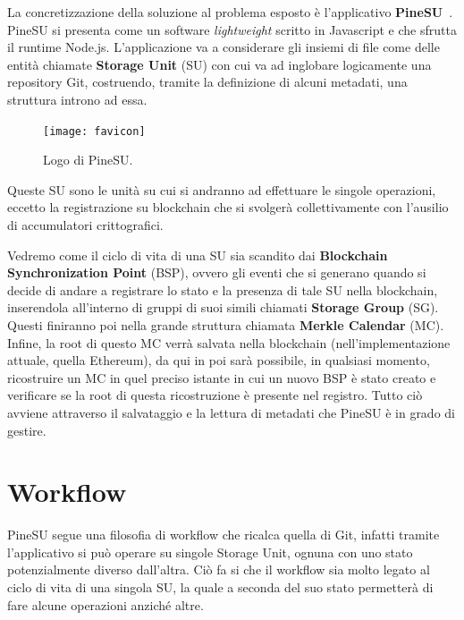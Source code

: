 
La concretizzazione della soluzione al problema esposto è l'applicativo \textbf{PineSU}~\cite{pinesu-github-21}. \\
PineSU si presenta come un software \emph{lightweight} scritto in Javascript e che sfrutta il runtime Node.js.
L'applicazione va a considerare gli insiemi di file come delle entità chiamate
\textbf{Storage Unit} (SU) con cui va ad inglobare logicamente una repository Git, costruendo,
tramite la definizione di alcuni metadati, una struttura introno ad essa.
\begin{figure}
    \vspace{-20pt}
    \begin{center}
        \texttt{[image: favicon]}
        \caption{\small{
        Logo di PineSU.
        } %
        } %
    \end{center}
    \vspace{-10pt}
\end{figure}
Queste SU sono le unità su cui si andranno ad effettuare le singole
operazioni, eccetto la registrazione su blockchain che si svolgerà collettivamente con l'ausilio di accumulatori crittografici. 

Vedremo come il ciclo di vita di una SU sia scandito dai \textbf{Blockchain Synchronization Point} (BSP),
ovvero gli eventi che si generano quando si decide di andare a registrare lo stato e la presenza di tale SU nella blockchain, inserendola
all'interno di gruppi di suoi simili chiamati \textbf{Storage Group} (SG). Questi finiranno poi nella grande struttura chiamata \textbf{Merkle Calendar} (MC).
Infine, la root di questo MC verrà salvata nella blockchain (nell'implementazione attuale, quella Ethereum), da qui in poi sarà possibile, in qualsiasi momento, ricostruire un MC in quel preciso istante in cui un nuovo BSP è stato creato e verificare se la root di questa ricostruzione è presente nel registro.
Tutto ciò avviene attraverso il salvataggio e la lettura di metadati che PineSU è in grado di gestire.

\section{Workflow}
\label{sec:work}

PineSU segue una filosofia di workflow che ricalca quella di Git,
infatti tramite l'applicativo si può operare su singole Storage Unit, ognuna con uno stato potenzialmente
diverso dall'altra. Ciò fa si che il workflow sia molto legato al ciclo di vita di una singola SU, la quale
a seconda del suo stato permetterà di fare alcune operazioni anziché altre.


